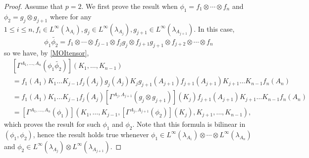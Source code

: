 \documentclass[12pt]{amsart}
\theoremstyle{remark}
\begin{document}
\begin{proof}
Assume that $p=2$. We first prove the result when $\phi_1 = f_1 \otimes \cdots \otimes f_n$ and $\phi_2 = g_j \otimes g_{j+1}$ where for any $1\leq i \leq n, f_i\in L^{\infty}(\lambda_{A_i}), g_j \in L^{\infty}(\lambda_{A_j}), g_{j+1} \in L^{\infty}(\lambda_{A_{j+1}})$. In this case,
$$
\phi_1 \widetilde{\phi_2} = f_1 \otimes \cdots \otimes f_{j-1} \otimes f_j g_j \otimes f_{j+1} g_{j+1} \otimes f_{j+2} \otimes \cdots \otimes f_n
$$
so we have, by \eqref{MOItensor},
\begin{align*}
& \left[ \Gamma^{A_1, \ldots, A_n}(\phi_1 \widetilde{\phi_2})\right] (K_1, \ldots, K_{n-1}) \\
& = f_1(A_1)K_1 \ldots K_{j-1} f_j(A_j) g_j(A_j) K_j g_{j+1}(A_{j+1}) f_{j+1}(A_{j+1}) K_{j+1} \ldots K_{n-1}f_n(A_n) \\
& = f_1(A_1)K_1 \ldots K_{j-1} f_j(A_j) \left[\Gamma^{A_j, A_{j+1}}(g_j\otimes g_{j+1})\right](K_j) f_{j+1}(A_{j+1}) K_{j+1} \ldots K_{n-1}f_n(A_n) \\
& = \left[ \Gamma^{A_1, \ldots, A_n}(\phi_1)\right] \left(K_1, \ldots, K_{j-1}, \left[\Gamma^{A_j, A_{j+1}}(\phi_2)\right](K_j), K_{j+1}, \ldots, K_{n-1}\right),
\end{align*}
which proves the result for such $\phi_1$ and $\phi_2$. Note that this formula is bilinear in $(\phi_1, \phi_2)$, hence the result holds true whenever $\phi_1 \in L^{\infty}(\lambda_{A_1}) \otimes \cdots \otimes L^{\infty}(\lambda_{A_n})$ and $\phi_2 \in L^{\infty}(\lambda_{A_j}) \otimes L^{\infty}(\lambda_{A_{j+1}})$.


\end{proof}
\end{document}
